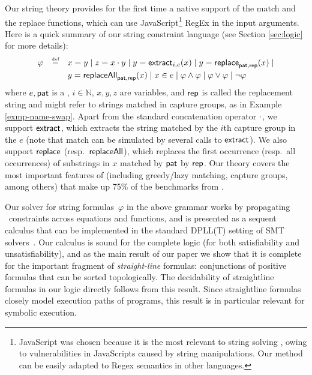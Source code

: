 Our string theory provides for the first time a native support of the match and the 
replace functions, which can use JavaScript\footnote{JavaScript was chosen 
because it is the most relevant to string solving 
\cite{BEK,Berkeley-JavaScript}, owing to vulnerabilities in JavaScripts 
caused by string manipulations. Our method can be easily adapted to Regex
semantics in other languages.} RegEx in the input arguments. Here is a quick
summary of our string constraint language (see Section \ref{sec:logic} for
more details):
\[
\begin{array}{l c l}
\smallskip
\varphi & \eqdef  & x = y \mid z = x \concat y \mid y  = \extract_{i, e}(x) \mid
y  = \replace_{\pat, \rep}(x) \mid 
\\
& & y = \replaceall_{\pat, \rep}(x)   \mid
 x \in e \mid \varphi \wedge \varphi \mid \varphi \vee \varphi \mid \neg \varphi \
\label{eq:SL}
\end{array}
\]
where $e, \mathsf{pat}$ is a \regexp{}, $i \in \mathbb{N}$, $x,y,z$ are variables, and $\mathsf{rep}$ 
is called the
replacement string and might refer to strings matched in capture groups,
as in Example \ref{exmp-name-swap}. Apart from the standard concatenation
operator $\cdot$, we support $\mathsf{extract}$, which extracts the string matched by
the $i$th capture group in the \regexp{} $e$ (note that match can be simulated
by several calls to $\mathsf{extract}$). We also support $\mathsf{replace}$ 
(resp.~$\mathsf{replaceAll}$), which replaces the first occurrence (resp.~all
occurrences) of substrings in $x$ matched by $\mathsf{pat}$ by $\mathsf{rep}$. Our theory
covers the most important features of \regexp{} (including greedy/lazy
matching, capture groups, among others) that make up 75\% of the benchmarks from
\cite{LMK19}.

Our solver for string formulas~$\varphi$ in the above grammar works by
propagating \regexp\ constraints across equations and functions, and
is presented as a sequent calculus that can be implemented in the
standard DPLL(T) setting of SMT
solvers~\cite{NieuwenhuisetalJACM2006}. Our calculus is sound for the
complete logic (for both satisfiability and unsatisfiability), and as
the main result of our paper we show that it is complete for the
important fragment of \emph{straight-line} formulas: conjunctions of
positive formulas that can be sorted topologically. The decidability
of straightline formulas in our logic directly follows from this
result. Since straightline formulas closely model execution paths of
programs, this result is in particular relevant for symbolic
execution.

